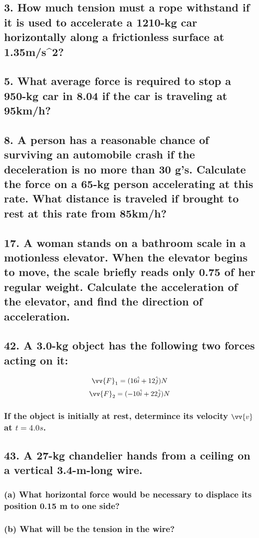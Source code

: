 \documentclass[12pt,a4paper,english]{article}
\begin{document}
\begin{flushleft}
  \subsection{3. How much tension must a rope withstand if it is used to accelerate a 1210-kg car horizontally along a frictionless surface at 1.35m/s^2?}
  \subsection{5. What average force is required to stop a 950-kg car in 8.04 if the car is traveling at 95km/h?}
  \subsection{8. A person has a reasonable chance of surviving an automobile crash if the deceleration is no more than 30 g's. Calculate the force on a 65-kg person accelerating at this rate. What distance is traveled if brought to rest at this rate from 85km/h?}
  \subsection{17. A woman stands on a bathroom scale in a motionless elevator. When the elevator begins to move, the scale briefly reads only 0.75 of her regular weight. Calculate the acceleration of the elevator, and find the direction of acceleration.}
  \subsection{42. A 3.0-kg object has the following two forces acting on it:}
  \[
    \vv{F}_1=(16\hat{i}+12\hat{j})N
  \]
  \[
    \vv{F}_2=(-10\hat{i}+22\hat{j})N
  \]
  \subsubsection{If the object is initially at rest, determince its velocity $\vv{v}$ at $t=4.0s$.}
  \subsection{43. A 27-kg chandelier hands from a ceiling on a vertical 3.4-m-long wire.}
  \subsubsection{(a) What horizontal force would be necessary to displace its position 0.15 m to one side?}
  \subsubsection{(b) What will be the tension in the wire?}

\end{flushleft}
\end{document}
